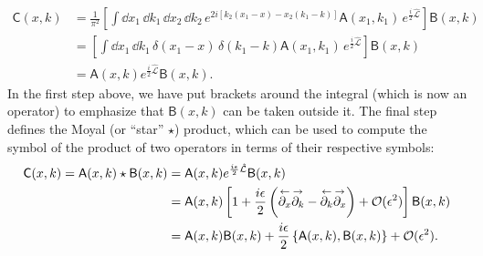 %
\begin{equation}
  \begin{aligned}
    \mathsf{C}(x, k) &= \frac{1}{\pi^{2}} \left[\int \dd{x_{1}}\, \dd{k_{1}}\, \dd{x_{2}}\, \dd{k_{2}}\,e^{2i[k_{2}(x_{1} - x) - x_{2}(k_{1} - k)]} \mathsf{A}(x_{1}, k_{1})\, e^{\frac{i}{2}\hat{\mathcal{L}}}\right] \mathsf{B}(x, k)\\
                     &= \left[\int \dd{x_{1}}\, \dd{k_{1}}\, \delta(x_{1} - x)\,\delta(k_{1} - k) \mathsf{A}(x_{1}, k_{1})\, e^{\frac{i}{2}\hat{\mathcal{L}}}\right] \mathsf{B}(x, k)\\
                     &= \mathsf{A}(x, k)e^{\frac{i}{2}\hat{\mathcal{L}}} \mathsf{B}(x, k).
  \end{aligned}
\end{equation}
%
In the first step above, we have put brackets around the integral (which is now an operator) to emphasize that $\mathsf{B}(x, k)$ can be taken outside it.
The final step defines the Moyal (or ``star'' $\star$) product, which can be used to compute the symbol of the product of two operators in terms of their respective symbols:
%
\begin{equation}
  \begin{aligned}
    \mathsf{C}(x, k) = \mathsf{A}(x, k)\star\mathsf{B}(x, k) &= \mathsf{A}(x, k)e^{\frac{i\epsilon}{2}\hat{\mathcal{L}}} \mathsf{B}(x, k)\\
                                                             &= \mathsf{A}(x, k)\left[1 + \frac{i\epsilon}{2}\left(\overset{\gets}{\partial_{x}}\overset{\to}{\partial_{k}} - \overset{\gets}{\partial_{k}}\overset{\to}{\partial_{x}}\right) + \mathcal{O}(\epsilon^{2}) \right] \mathsf{B}(x, k)\\
                                                             &= \mathsf{A}(x, k)\mathsf{B}(x, k) + \frac{i\epsilon}{2}\left\{\mathsf{A}(x, k), \mathsf{B}(x, k)\right\} + \mathcal{O}(\epsilon^{2}).
  \end{aligned}
\end{equation}



